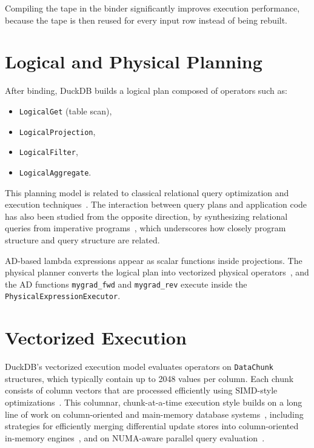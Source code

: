 \documentclass[12pt]{report}
\begin{document}
Compiling the tape in the binder significantly improves execution performance, because the tape is then reused for every input row instead of being rebuilt.

\section{Logical and Physical Planning}

After binding, DuckDB builds a logical plan composed of operators such as:

\begin{itemize}
    \item \texttt{LogicalGet} (table scan),
    \item \texttt{LogicalProjection},
    \item \texttt{LogicalFilter},
    \item \texttt{LogicalAggregate}.
\end{itemize}

This planning model is related to classical relational query optimization and execution techniques~\cite{selinger1979access,graefe1993query,neumann2011efficiently,chaudhuri1998optimization,graefe1994volcano}. The interaction between query plans and application code has also been studied from the opposite direction, by synthesizing relational queries from imperative programs~\cite{cheung2013synthesis}, which underscores how closely program structure and query structure are related.

AD-based lambda expressions appear as scalar functions inside projections. The physical planner converts the logical plan into vectorized physical operators~\cite{raasveldt2022modular}, and the AD functions \texttt{mygrad\_fwd} and \texttt{mygrad\_rev} execute inside the \texttt{PhysicalExpressionExecutor}.

\section{Vectorized Execution}

DuckDB's vectorized execution model evaluates operators on \texttt{DataChunk} structures, which typically contain up to 2048 values per column. Each chunk consists of column vectors that are processed efficiently using SIMD-style optimizations~\cite{raasveldt2022modular,kersten2018vectorized,boncz2008monetdb}. This columnar, chunk-at-a-time execution style builds on a long line of work on column-oriented and main-memory database systems~\cite{stonebraker2005cstore,abadi2006compression,harizopoulos2006readoptimized,manegold2002mainmemory}, including strategies for efficiently merging differential update stores into column-oriented in-memory engines~\cite{hubner2011differential}, and on NUMA-aware parallel query evaluation~\cite{leis2014morsel}.
\end{document}
